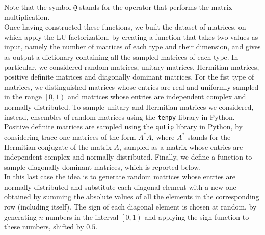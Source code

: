\documentclass[a4paper,11pt]{article}
\begin{document}
\noindent Note that the symbol \texttt{@} stands for the operator that performs the matrix multiplication.\\

\noindent Once having constructed these functions, we built the dataset of matrices, on which apply the LU factorization, by creating a function that takes two values as input, namely the number of matrices of each type and their dimension, and gives as output a dictionary containing all the sampled matrices of each type. In particular, we considered random matrices, unitary matrices, Hermitian matrices, positive definite matrices and diagonally dominant matrices. For the fist type of matrices, we distinguished matrices whose entries are real and uniformly sampled in the range $\left[0,1\right)$ and matrices whose entries are independent complex and normally distributed. To sample unitary and Hermitian matrices we considered, instead, ensembles of random matrices using the \texttt{tenpy} library in Python. Positive definite matrices are sampled using the \texttt{qutip} library in Python, by considering trace-one matrices of the form $A^{*}A$, where $A^{*}$ stands for the Hermitian conjugate of the matrix $A$, sampled as a matrix whose entries are independent complex and normally distributed. Finally, we define a function to sample diagonally dominant matrices, which is reported below.\\

\noindent In this last case the idea is to generate random matrices whose entries are normally distributed and substitute each diagonal element with a new one obtained by summing the absolute values of all the elements in the corresponding row (including itself). The sign of each diagonal element is chosen at random, by generating $n$ numbers in the interval $\left[0,1\right)$ and applying the sign function to these numbers, shifted by $0.5$.
\end{document}
